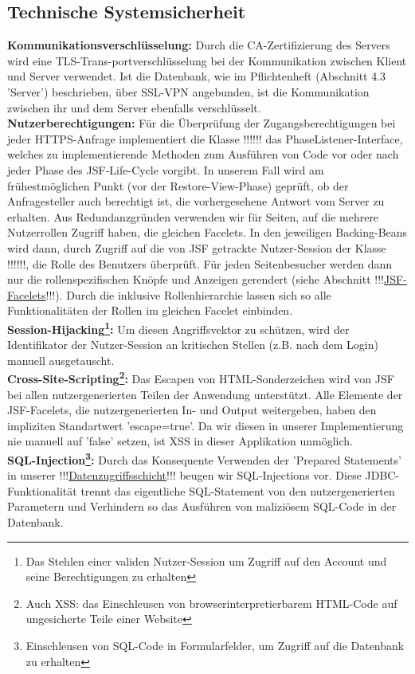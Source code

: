 \documentclass{article}
\begin{document}
\subsection{Technische Systemsicherheit}
\noindent \textbf{Kommunikationsverschlüsselung:} Durch die CA-Zertifizierung des Servers wird eine TLS-Trans-portverschlüsselung bei der Kommunikation zwischen Klient und Server verwendet. Ist die Datenbank, wie im Pflichtenheft (Abschnitt 4.3  'Server') beschrieben, über SSL-VPN angebunden, ist die Kommunikation zwischen ihr und dem Server ebenfalls verschlüsselt. \\
\textbf{Nutzerberechtigungen:} Für die Überprüfung der Zugangsberechtigungen bei jeder HTTPS-Anfrage implementiert die Klasse !!!\hyperlink{PhaseListener}{}!!! das PhaseListener-Interface, welches zu implementierende Methoden zum Ausführen von Code vor oder nach jeder Phase des JSF-Life-Cycle vorgibt. In unserem Fall wird am frühestmöglichen Punkt (vor der Restore-View-Phase) geprüft, ob der Anfragesteller auch berechtigt ist, die vorhergesehene Antwort vom Server zu erhalten. Aus Redundanzgründen verwenden wir für Seiten, auf die mehrere Nutzerrollen Zugriff haben, die gleichen Facelets. In den jeweiligen Backing-Beans wird dann, durch Zugriff auf die von JSF getrackte Nutzer-Session der Klasse !!!\hyperlink{Session}{}!!!, die Rolle des Benutzers überprüft. Für jeden Seitenbesucher werden dann nur die rollenspezifischen Knöpfe und Anzeigen gerendert (siehe Abschnitt !!!\hyperlink{Facelets}{JSF-Facelets}!!!). Durch die inklusive Rollenhierarchie lassen sich so alle Funktionalitäten der Rollen im gleichen Facelet einbinden.\\
\textbf{Session-Hijacking\footnote{Das Stehlen einer validen Nutzer-Session um Zugriff auf den Account und seine Berechtigungen zu erhalten}:} Um diesen Angriffsvektor zu schützen, wird der Identifikator der Nutzer-Session an kritischen Stellen (z.B. nach dem Login) manuell ausgetauscht. \\
\textbf{Cross-Site-Scripting\footnote{Auch XSS: das Einschleusen von browserinterpretierbarem HTML-Code auf ungesicherte Teile einer Website}:} Das Escapen von HTML-Sonderzeichen wird von JSF bei allen nutzergenerierten Teilen der Anwendung unterstützt. Alle Elemente der JSF-Facelets, die nutzergenerierten In- und Output weitergeben, haben den impliziten Standartwert 'escape=true'. Da wir diesen in unserer Implementierung nie manuell auf 'false' setzen, ist XSS in dieser Applikation unmöglich. \\
\textbf{SQL-Injection\footnote{Einschleusen von SQL-Code in Formularfelder, um Zugriff auf die Datenbank zu erhalten}:} Durch das Konsequente Verwenden der 'Prepared Statements' in unserer !!!\hyperlink{DAOs}{Datenzugriffsschicht}!!! beugen wir SQL-Injections vor. Diese JDBC-Funktionalität trennt das eigentliche SQL-Statement von den nutzergenerierten Parametern und Verhindern so das Ausführen von maliziösem SQL-Code in der Datenbank. \\
\end{document}
